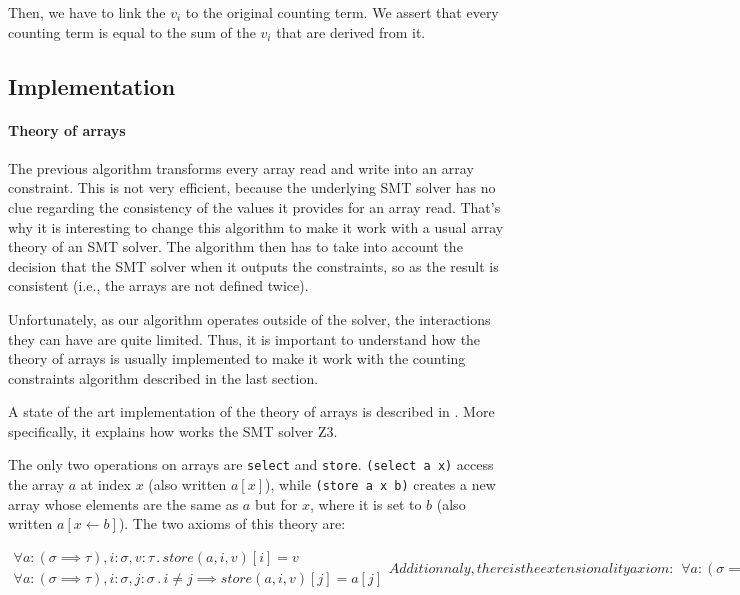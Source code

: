 {Then, we have to link the $v_i$ to the original counting term. We assert that
every counting term is equal to the sum of the $v_i$ that are derived from it.

}

\subsection{Implementation}

\paragraph{Theory of arrays} The previous algorithm transforms every array read and write into an
array constraint. This is not very efficient, because the underlying SMT
solver has no clue regarding the consistency of the values it provides
for an array read. That's why it is interesting to change this algorithm
to make it work with a usual array theory of an SMT solver. The
algorithm then has to take into account the decision that the SMT solver
when it outputs the constraints, so as the result is consistent
(i.e., the arrays are not defined twice).

Unfortunately, as our algorithm operates outside of the solver, the
interactions they can have are quite limited. Thus, it is important to
understand how the theory of arrays is usually implemented to make it
work with the counting constraints algorithm described in the last
section.

A state of the art implementation of the theory of arrays is described
in \cite{de2009generalized}. More specifically, it
explains how works the SMT solver Z3.

The only two operations on arrays are \texttt{select} and
\texttt{store}. \texttt{(select\ a\ x)} access the array $a$ at index
$x$ (also written $a[x]$), while \texttt{(store\ a\ x\ b)} creates a
new array whose elements are the same as $a$ but for $x$, where it
is set to $b$ (also written $a[x \leftarrow b]$). The two axioms of this theory are:

\begin{subequations}
    \begin{align}
        \forall a:(\sigma \implies \tau), i:\sigma, v:\tau\, .\, store(a, i, v)[i] = v
        \\
        \forall a:(\sigma \implies \tau), i:\sigma, j:\sigma\, .\, i \neq j \implies store(a, i, v)[j] = a[j]
    \end{align}


    Additionnaly, there is the extensionality axiom:

    \begin{align}
        \forall a:(\sigma \implies \tau), b:(\sigma \implies \tau)\, .\, a \neq b \iff \exists i\: a[i] \implies a[i] \neq b[i]
    \end{align}
\end{subequations}

